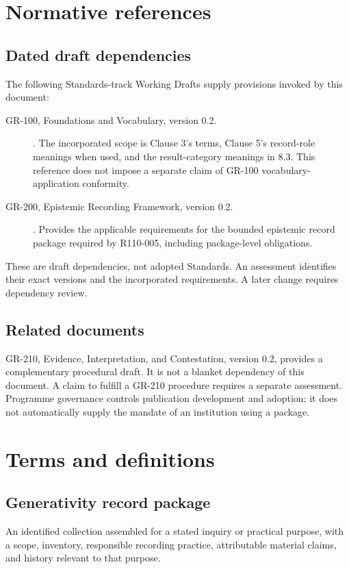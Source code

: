 \documentclass[11pt,a4paper]{article}
\begin{document}
\section{Normative references}
\subsection{Dated draft dependencies}
The following Standards-track Working Drafts supply provisions invoked by this document:
\begin{description}
\item[GR-100, Foundations and Vocabulary, version 0.2.] . The incorporated scope is Clause 3's terms, Clause 5's record-role meanings when used, and the result-category meanings in 8.3. This reference does not impose a separate claim of GR-100 vocabulary-application conformity.
\item[GR-200, Epistemic Recording Framework, version 0.2.] . Provides the applicable requirements for the bounded epistemic record package required by R110-005, including package-level obligations.
\end{description}
These are draft dependencies, not adopted Standards. An assessment identifies their exact versions and the incorporated requirements. A later change requires dependency review.

\subsection{Related documents}
GR-210, Evidence, Interpretation, and Contestation, version 0.2, provides a complementary procedural draft. It is not a blanket dependency of this document. A claim to fulfill a GR-210 procedure requires a separate assessment. Programme governance controls publication development and adoption; it does not automatically supply the mandate of an institution using a package.

\section{Terms and definitions}
\subsection{Generativity record package}
An identified collection assembled for a stated inquiry or practical purpose, with a scope, inventory, responsible recording practice, attributable material claims, and history relevant to that purpose.
\end{document}

